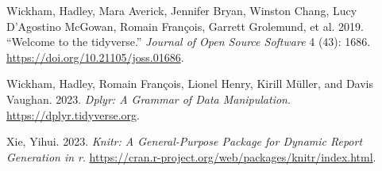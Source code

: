 \documentclass[
  letterpaper,
  DIV=11,
  numbers=noendperiod]{scrartcl}
\newlength{\cslhangindent}
\newenvironment{CSLReferences}[2] %
 {\begin{list}{}{%
  \setlength{\itemindent}{0pt}
  \setlength{\leftmargin}{0pt}
  \setlength{\parsep}{0pt}
  \ifodd #1
   \setlength{\leftmargin}{\cslhangindent}
   \setlength{\itemindent}{-1\cslhangindent}
  \fi
  \setlength{\itemsep}{#2\baselineskip}}}
 {\end{list}}
\begin{document}
\begin{CSLReferences}{1}{0}
Wickham, Hadley, Mara Averick, Jennifer Bryan, Winston Chang, Lucy
D'Agostino McGowan, Romain François, Garrett Grolemund, et al. 2019.
{``Welcome to the {tidyverse}.''} \emph{Journal of Open Source Software}
4 (43): 1686. \url{https://doi.org/10.21105/joss.01686}.

Wickham, Hadley, Romain François, Lionel Henry, Kirill Müller, and Davis
Vaughan. 2023. \emph{Dplyr: A Grammar of Data Manipulation}.
\url{https://dplyr.tidyverse.org}.

Xie, Yihui. 2023. \emph{Knitr: A General-Purpose Package for Dynamic
Report Generation in r}.
\url{https://cran.r-project.org/web/packages/knitr/index.html}.

\end{CSLReferences}
\end{document}
